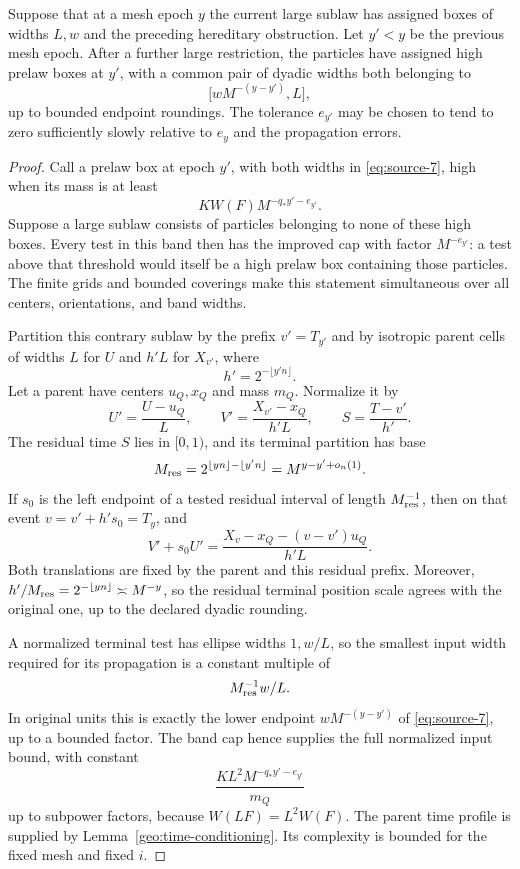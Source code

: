 \begin{lemma}\label{geo:width-band}
Suppose that at a mesh epoch \(y\) the current large sublaw
has assigned boxes of widths \(L,w\) and the preceding
hereditary obstruction.  Let \(y'<y\) be the previous mesh
epoch.  After a further large restriction, the particles
have assigned high prelaw boxes at \(y'\), with a common
pair of dyadic widths both belonging to
\begin{equation}\label{eq:source-7}
\bigl[wM^{-(y-y')},L\bigr],
\end{equation}
up to bounded endpoint roundings.  The tolerance \(e_{y'}\)
may be chosen to tend to zero sufficiently slowly relative
to \(e_y\) and the propagation errors.
\end{lemma}

\begin{proof}
Call a prelaw box at epoch \(y'\), with both widths in
\eqref{eq:source-7}, high when its mass is at least
\[
KW(F)M^{-q_*y'-e_{y'}}.
\]
Suppose a large sublaw consists of particles belonging to
none of these high boxes.  Every test in this band then
has the improved cap with factor \(M^{-e_{y'}}\): a test
above that threshold would itself be a high prelaw box
containing those particles.  The finite grids and bounded
coverings make this statement simultaneous over all
centers, orientations, and band widths.

Partition this contrary sublaw by the prefix \(v'=T_{y'}\)
and by isotropic parent cells of widths \(L\) for \(U\)
and \(h'L\) for \(X_{v'}\), where
\[
h'=2^{-\lfloor y'n\rfloor}.
\]
Let a parent have centers \(u_Q,x_Q\) and mass \(m_Q\).
Normalize it by
\[
U'=\frac{U-u_Q}{L},\qquad
V'=\frac{X_{v'}-x_Q}{h'L},\qquad
S=\frac{T-v'}{h'}.
\]
The residual time \(S\) lies in \([0,1)\), and its terminal
partition has base
\[
M_{\rm res}
=2^{\lfloor yn\rfloor-\lfloor y'n\rfloor}
=M^{y-y'+o_n(1)}.
\]
If \(s_0\) is the left endpoint of a tested residual interval of
length \(M_{\rm res}^{-1}\), then on that event
\(v=v'+h's_0=T_y\), and
\[
V'+s_0U'
=\frac{X_v-x_Q-(v-v')u_Q}{h'L}.
\]
Both translations are fixed by the parent and this residual prefix.
Moreover, \(h'/M_{\rm res}=2^{-\lfloor yn\rfloor}\asymp M^{-y}\),
so the residual terminal position scale agrees with the original
one, up to the declared dyadic rounding.

A normalized terminal test has ellipse widths \(1,w/L\),
so the smallest input width required for its propagation
is a constant multiple of
\[
M_{\rm res}^{-1}w/L.
\]
In original units this is exactly the lower endpoint
\(wM^{-(y-y')}\) of \eqref{eq:source-7}, up to a bounded
factor.  The band cap hence supplies the full normalized
input bound, with constant
\[
\frac{K L^2M^{-q_*y'-e_{y'}}}{m_Q}
\]
up to subpower factors, because \(W(LF)=L^2W(F)\).
The parent time profile is supplied by
Lemma~\ref{geo:time-conditioning}.  Its complexity is
bounded for the fixed mesh and fixed \(i\).


\end{proof}
